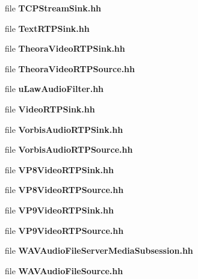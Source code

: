 \begin{DoxyCompactItemize}
file {\bf T\+C\+P\+Stream\+Sink.\+hh}
\item 
file {\bf Text\+R\+T\+P\+Sink.\+hh}
\item 
file {\bf Theora\+Video\+R\+T\+P\+Sink.\+hh}
\item 
file {\bf Theora\+Video\+R\+T\+P\+Source.\+hh}
\item 
file {\bf u\+Law\+Audio\+Filter.\+hh}
\item 
file {\bf Video\+R\+T\+P\+Sink.\+hh}
\item 
file {\bf Vorbis\+Audio\+R\+T\+P\+Sink.\+hh}
\item 
file {\bf Vorbis\+Audio\+R\+T\+P\+Source.\+hh}
\item 
file {\bf V\+P8\+Video\+R\+T\+P\+Sink.\+hh}
\item 
file {\bf V\+P8\+Video\+R\+T\+P\+Source.\+hh}
\item 
file {\bf V\+P9\+Video\+R\+T\+P\+Sink.\+hh}
\item 
file {\bf V\+P9\+Video\+R\+T\+P\+Source.\+hh}
\item 
file {\bf W\+A\+V\+Audio\+File\+Server\+Media\+Subsession.\+hh}
\item 
file {\bf W\+A\+V\+Audio\+File\+Source.\+hh}
\end{DoxyCompactItemize}
